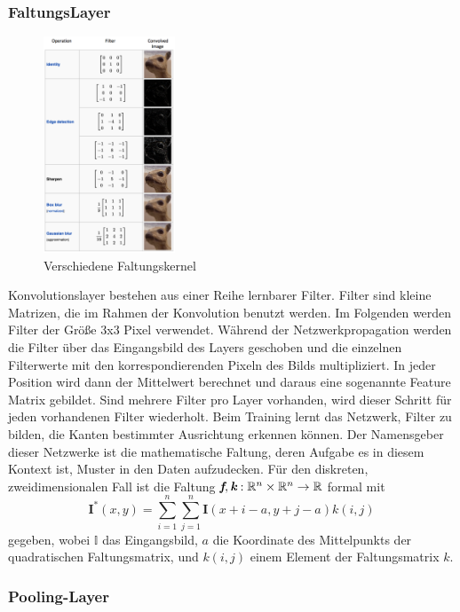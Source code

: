 \subsubsection{FaltungsLayer}
\begin{figure}
	\centering
	\includegraphics[width=0.35\textwidth]{abb/convolution.png}
	\caption{Verschiedene Faltungskernel}
\end{figure}
Konvolutionslayer bestehen aus einer Reihe lernbarer Filter. Filter sind kleine Matrizen, die im Rahmen der Konvolution benutzt werden. Im Folgenden werden Filter der Größe 3x3 Pixel verwendet. Während der Netzwerkpropagation werden die Filter über das Eingangsbild des Layers geschoben und die einzelnen Filterwerte mit den korrespondierenden Pixeln des Bilds multipliziert. In jeder Position wird dann der Mittelwert berechnet und daraus eine sogenannte Feature Matrix gebildet. Sind mehrere Filter pro Layer vorhanden, wird dieser Schritt für jeden vorhandenen Filter wiederholt. Beim Training lernt das Netzwerk, Filter zu bilden, die Kanten bestimmter Ausrichtung erkennen können.
Der Namensgeber dieser Netzwerke ist die mathematische Faltung, deren Aufgabe es in diesem Kontext ist, Muster in den Daten aufzudecken. Für den diskreten, zweidimensionalen Fall ist die Faltung $\textit{\textbf{f}}, \textit{\textbf{k}}: \mathbb{R}^n\times\mathbb{R}^n \rightarrow \mathbb{R}$ formal mit
$$ \textbf{I}^*(x, y) = \sum_{i=1}^{n}\sum_{j=1}^{n}\textbf{I}(x+i-a, y+j-a)k(i,j) $$
gegeben, wobei $\mathbb{I}$ das Eingangsbild, $a$ die Koordinate des Mittelpunkts der quadratischen Faltungsmatrix, und $k(i,j)$ einem Element der Faltungsmatrix $k$.
\subsubsection{Pooling-Layer}

